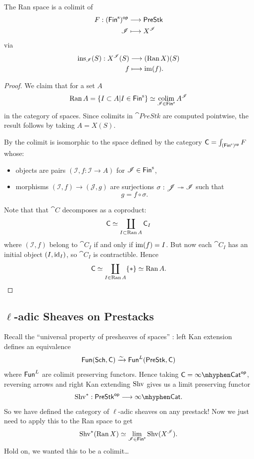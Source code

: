 \documentclass[oneside]{amsart}
\newcommand{\CI}{\mathcal{I}}
\newcommand{\PreStk}{\cat{PreStk}}
\newcommand{\CJ}{\mathcal{J}}
\begin{document}
\begin{proposition}\label{prop:rancolim}
	The Ran space is a colimit of
	\begin{align*}
		F: (\Fins)\op &\longrightarrow \PreStk \\
		\CI &\longmapsto X^{\CI}
	\end{align*}
	via
	\begin{align*}
		\ins_\CI(S): X^{\CI}(S) &\longrightarrow (\Ran X)(S) \\
		f &\longmapsto \img(f).
	\end{align*}
\end{proposition}
\begin{proof}
	We claim that for a set $A$
	\[
	\Ran A = \left\{ I\subset A \middle| I\in \Fins \right\} \isoto \colim_{\CI\in \Fins}A^{\CI}
	\] 
	in the category of spaces. Since colimits in $\PreStk$ are computed pointwise, the result follows by taking $A=X(S)$.

	By \cite[\href{https://kerodon.net/tag/02VF}{Tag 02VF}]{kerodon} the colimit is isomorphic to the space defined by the category $\cat{C}=\int_{(\Fins)\op} F$ whose:
	\begin{itemize}
		\item objects are pairs $(\CI,f:\CI\to A)$ for $\CI\in \Fins$,
		\item morphisms $(\CI,f)\to (\CJ,g)$ are surjections $\sigma:\CJ\surjto \CI$ such that
			\[
			g = f\circ\sigma.
			\] 
	\end{itemize}
	Note that that $\cat{C}$ decomposes as a coproduct:
	\[
		\mathsf{C} \simeq \coprod_{I\subset \operatorname{Ran} A}\mathsf{C}_I
	\] 
	where $(\CI,f)$ belong to $\cat{C}_I$ if and only if $\operatorname{im}(f) = I$. But now each $\cat{C}_I$ has an initial object $(I,\operatorname{id}_I)$, so $\cat{C}_I$ is contractible. Hence
	\[
		\mathsf{C} \simeq \coprod_{I\in \operatorname{Ran} A} \{*\} \simeq \operatorname{Ran} A.
	\] 
\end{proof}

\subsection{\texorpdfstring{$\ell$-adic Sheaves on Prestacks}{l-adic Sheaves on Prestacks}}
Recall the ``universal property of presheaves of spaces'' \cite[\href{https://kerodon.net/tag/03WH}{Tag 03WH}]{kerodon}: left Kan extension defines an equivalence
\[
	\Fun(\Sch,\cat{C}) \simto \Fun^{L}(\PreStk,\cat{C})
\] 
where $\mathsf{Fun}^{L}$ are colimit preserving functors. Hence taking $\cat{C}=\iCat\op$, reversing arrows and right Kan extending $\operatorname{Shv}$ gives us a limit preserving functor
\[
\Shv^{*}:\PreStk\op \to \iCat.
\] 
So we have defined the category of $\ell$-adic sheaves on any prestack! Now we just need to apply this to the Ran space to get
\[
\Shv^{*}(\Ran X) \isoto \lim_{\CI\in \Fins} \Shv(X^{\CI}).
\] 
Hold on, we wanted this to be a colimit\dots
\end{document}

